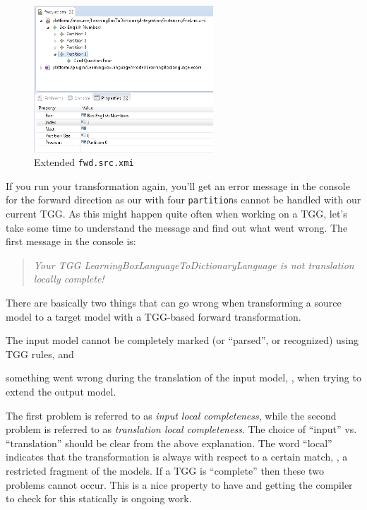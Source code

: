 \begin{figure}[htbp]
\begin{center}
  \includegraphics[width=0.6\textwidth]{../../org.moflon.doc.handbook.04_tripleGraphTransformations/6_extendingTransformation/splashImages/eclipse_fillFourthPartition}
  \caption{Extended \texttt{fwd.src.xmi}}
  \label{fig:ea_extended_fwd_src_xmi}
\end{center}
\end{figure}


If you run your transformation again, you'll get an error message in the console for the forward direction as our  with four \texttt{partition}s cannot be handled with our current TGG.
As this might happen quite often when working on a TGG, let's take some time to understand the message and find out what went wrong.
The first message in the console is:
\begin{quote}
  \emph{Your TGG LearningBoxLanguageToDictionaryLanguage is not translation locally complete!}
\end{quote}

There are basically two things that can go wrong when transforming a source model to a target model with a TGG-based forward transformation.%
\begin{inparaenum}[(1)]
\item The input model cannot be completely marked (or \enquote{parsed}, or recognized) using TGG rules, and 
\item something went wrong during the translation of the input model, \idest, when trying to extend the output model.
\end{inparaenum}
The first problem is referred to as \emph{input local completeness}, while the second problem is referred to as \emph{translation local completeness}.
The choice of \enquote{input} vs. \enquote{translation} should be clear from the above explanation.
The word \enquote{local} indicates that the transformation is always with respect to a certain match, \idest, a restricted fragment of the models.
If a TGG is \enquote{complete} then these two problems cannot occur.
This is a nice property to have and getting the compiler to check for this statically is ongoing work. 

